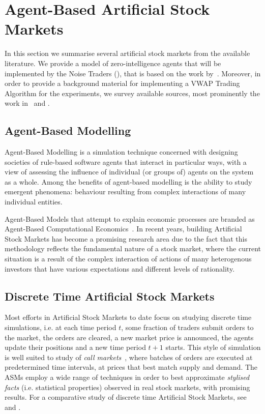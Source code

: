 \section{Agent-Based Artificial Stock Markets}
\label{Chapters/Background/Agent-Based-Modelling}

In this section we summarise several artificial stock markets from the available literature. We provide a model of zero-intelligence agents that will be implemented by the Noise Traders (), that is based on the work by~\citet[chap.~4]{Gilles2006}. Moreover, in order to provide a background material for implementing a VWAP Trading Algorithm for the experiments, we survey available sources, most prominently the work in~\citet{Coggins2006} and \citet{Kakade2004}. 

\subsection{Agent-Based Modelling}
Agent-Based Modelling is a simulation technique concerned with designing societies of rule-based software agents that interact in particular ways, with a view of assessing the influence of individual (or groups of) agents on the system as a whole. Among the benefits of agent-based modelling is the ability to study emergent phenomena: behaviour resulting from complex interactions of many individual entities.

Agent-Based Models that attempt to explain economic processes are branded as Agent-Based Computational Economics~\cite{Tesfatsion2006}. In recent years, building Artificial Stock Markets has become a promising research area due to the fact that this methodology reflects the fundamental nature of a stock market, where the current situation is a result of the complex interaction of actions of many heterogenous investors that have various expectations and different levels of rationality.

\subsection{Discrete Time Artificial Stock Markets}
Most efforts in Artificial Stock Markets to date focus on studying discrete time simulations, i.e. at each time period $t$, some fraction of traders submit orders to the market, the orders are cleared, a new market price is announced, the agents update their positions and a new time period $t+1$ starts. This style of simulation is well suited to study of \textit{call markets}~\cite{Schwartz1995}, where batches of orders are executed at predetermined time intervals, at prices that best match supply and demand. The ASMs employ a wide range of techniques in order to best approximate \textit{stylised facts} (i.e. statistical properties) observed in real stock markets, with promising results. For a comparative study of discrete time Artificial Stock Markets, see~\citet{Jha2010} and \citet{Sorban2008}.

